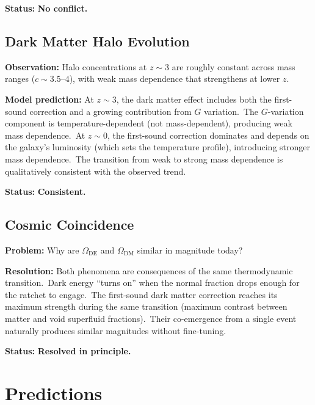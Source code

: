 \documentclass[12pt,letterpaper]{article}
\begin{document}
\textbf{Status:} \textbf{No conflict.}


\subsection{Dark Matter Halo Evolution}

\textbf{Observation:} Halo concentrations at $z \sim 3$ are roughly constant
across mass ranges ($c \sim 3.5$--$4$), with weak mass dependence that
strengthens at lower $z$.

\textbf{Model prediction:} At $z \sim 3$, the dark matter effect includes both
the first-sound correction and a growing contribution from $G$ variation.\
The $G$-variation component is temperature-dependent (not mass-dependent),
producing weak mass dependence.\ At $z \sim 0$, the first-sound correction
dominates and depends on the galaxy's luminosity (which sets the temperature
profile), introducing stronger mass dependence.\ The transition from
weak to strong mass dependence is qualitatively consistent with the observed
trend.

\textbf{Status:} \textbf{Consistent.}


\subsection{Cosmic Coincidence}

\textbf{Problem:} Why are $\Omega_{\mathrm{DE}}$ and $\Omega_{\mathrm{DM}}$
similar in magnitude today?

\textbf{Resolution:} Both phenomena are consequences of the same thermodynamic
transition.\ Dark energy ``turns on'' when the normal fraction drops enough for
the ratchet to engage.\ The first-sound dark matter correction reaches its
maximum strength during the same transition (maximum contrast between matter
and void superfluid fractions).\ Their co-emergence from a single event naturally
produces similar magnitudes without fine-tuning.

\textbf{Status:} \textbf{Resolved in principle.}


\section{Predictions}
\label{sec:predictions}
\end{document}
